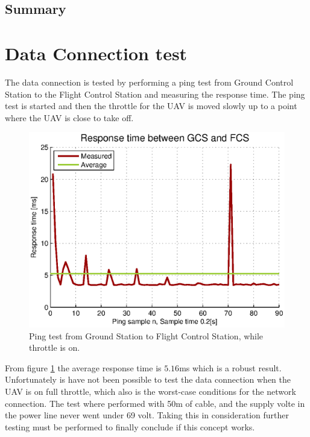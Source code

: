 \subsection{Summary}



\newpage
\section{Data Connection test}
The data connection is tested by performing a ping test from Ground Control Station to the Flight Control Station and measuring the response time. The ping test is started and then the throttle for the UAV is moved slowly up to a point where the UAV is close to take off.

\begin{figure}[hbtp]
\centering
\includegraphics[scale=1]{graphics/pingTest.eps}
\caption{Ping test from Ground Station to Flight Control Station, while throttle is on.}
\label{fig:pingTest}
\end{figure}

\noindent
From figure \ref{fig:pingTest} the average response time is $5.16$ms which is a robust result. Unfortunately is have not been possible to test the data connection when the UAV is on full throttle, which also is the worst-case conditions for the network connection. The test where performed with 50m of cable, and the supply volte in the power line never went under 69 volt. Taking this in consideration further testing must be performed to finally conclude if this concept works. 


